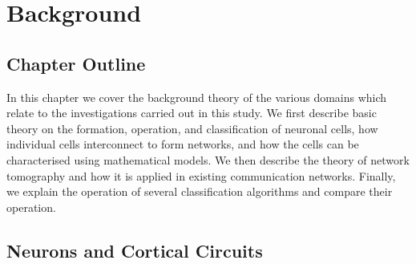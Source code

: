 \chapter{Background}
\label{chap:back}
\section*{Chapter Outline}
In this chapter we cover the background theory of the various domains which relate to the investigations carried out in this study. We first describe basic theory on the formation, operation, and classification of neuronal cells, how individual cells interconnect to form networks, and how the cells can be characterised using mathematical models. We then describe the theory of network tomography and how it is applied in existing communication networks. Finally, we explain the operation of several classification algorithms and compare their operation.

\section{Neurons and Cortical Circuits}
\label{chap:back:neurons}

